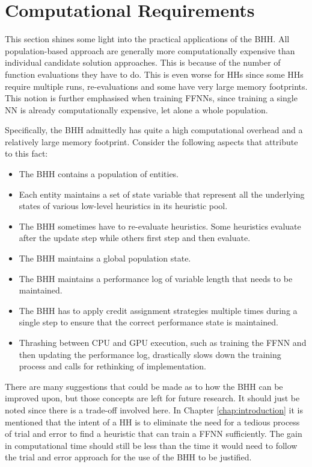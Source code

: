 \section{Computational Requirements}
\label{sec:results:computational_requirements}

This section shines some light into the practical applications of the \Ac{BHH}. All population-based approach are generally more computationally expensive than individual candidate solution approaches. This is because of the number of function evaluations they have to do. This is even worse for \acp{HH} since some \acp{HH} require multiple runs, re-evaluations and some have very large memory footprints. This notion is further emphasised when training \acp{FFNN}, since training a single \ac{NN} is already computationally expensive, let alone a whole population.

Specifically, the \Ac{BHH} admittedly has quite a high computational overhead and a relatively large memory footprint. Consider the following aspects that attribute to this fact:

\begin{itemize}
      \item The \Ac{BHH} contains a population of entities.
      \item Each entity maintains a set of state variable that represent all the underlying states of various low-level heuristics in its heuristic pool.
      \item The \Ac{BHH} sometimes have to re-evaluate heuristics. Some heuristics evaluate after the update step while others first step and then evaluate.
      \item The \Ac{BHH} maintains a global population state.
      \item The \Ac{BHH} maintains a performance log of variable length that needs to be maintained.
      \item The \Ac{BHH} has to apply credit assignment strategies multiple times during a single step to ensure that the correct performance state is maintained.
      \item Thrashing between CPU and GPU execution, such as training the \Acs{FFNN} and then updating the performance log, drastically slows down the training process and calls for rethinking of  implementation.
\end{itemize}

There are many suggestions that could be made as to how the \ac{BHH} can be improved upon, but those concepts are left for future research. It should just be noted since there is a trade-off involved here. In Chapter \ref{chap:introduction} it is mentioned that the intent of a \ac{HH} is to eliminate the need for a tedious process of trial and error to find a heuristic that can train a \ac{FFNN} sufficiently. The gain in computational time should still be less than the time it would need to follow the trial and error approach for the use of the \Ac{BHH} to be justified.

